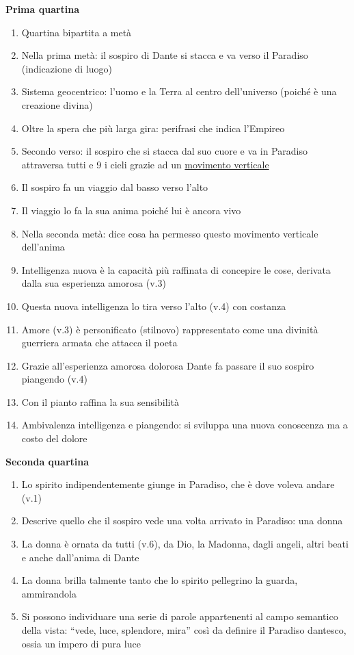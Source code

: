 \documentclass{article}
\begin{document}
\textbf{Prima quartina}
\begin{enumerate}
    \item Quartina bipartita a metà
    \item Nella prima metà: il sospiro di Dante si stacca e va verso il Paradiso (indicazione di
        luogo)
    \item Sistema geocentrico: l'uomo e la Terra al centro dell'universo (poiché è una creazione
        divina)
    \item Oltre la spera che più larga gira: perifrasi che indica l'Empireo
    \item Secondo verso: il sospiro che si stacca dal suo cuore e va in Paradiso attraversa
        tutti e 9 i cieli grazie ad un \underline{movimento verticale}
    \item Il sospiro fa un viaggio dal basso verso l'alto
    \item Il viaggio lo fa la sua anima poiché lui è ancora vivo
    \item Nella seconda metà: dice cosa ha permesso questo movimento verticale dell'anima 
    \item Intelligenza nuova è la capacità più raffinata di concepire le cose, derivata dalla
        sua esperienza amorosa (v.3)
    \item Questa nuova intelligenza lo tira verso l'alto (v.4) con costanza
    \item Amore (v.3) è personificato (stilnovo) rappresentato come una divinità guerriera
        armata che attacca il poeta
    \item Grazie all'esperienza amorosa dolorosa Dante fa passare il suo sospiro piangendo (v.4)
    \item Con il pianto raffina la sua sensibilità
    \item Ambivalenza intelligenza e piangendo: si sviluppa una nuova conoscenza ma a costo del
        dolore
\end{enumerate}

\textbf{Seconda quartina}
\begin{enumerate}
    \item Lo spirito indipendentemente giunge in Paradiso, che è dove voleva andare (v.1)
    \item Descrive quello che il sospiro vede una volta arrivato in Paradiso: una donna
    \item La donna è ornata da tutti (v.6), da Dio, la Madonna, dagli angeli, altri beati e
        anche dall'anima di Dante
    \item La donna brilla talmente tanto che lo spirito pellegrino la guarda, ammirandola
    \item Si possono individuare una serie di parole appartenenti al campo semantico della
        vista: ``vede, luce, splendore, mira'' così da definire il Paradiso dantesco, ossia
        un impero di pura luce
\end{enumerate}
\end{document}
